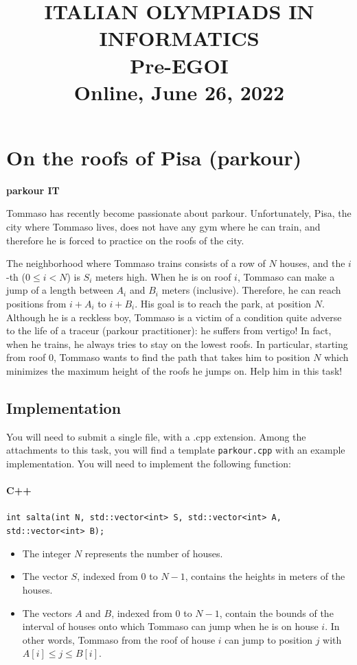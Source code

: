 \documentclass[11pt, a4paper]{article}
\title{\textbf{ITALIAN OLYMPIADS IN INFORMATICS}\\Pre-EGOI\\Online, June 26, 2022}
\author{}
\date{}
\begin{document}
\maketitle
\vspace{-4em}

\section*{On the roofs of Pisa (parkour)}
\textbf{parkour IT}

Tommaso has recently become passionate about parkour. Unfortunately, Pisa, the city where Tommaso lives, does not have any gym where he can train, and therefore he is forced to practice on the roofs of the city.

The neighborhood where Tommaso trains consists of a row of $N$ houses, and the $i$-th ($0\le i<N$) is $S_{i}$ meters high.
When he is on roof $i$, Tommaso can make a jump of a length between $A_{i}$ and $B_{i}$ meters (inclusive).
Therefore, he can reach positions from $i+A_{i}$ to $i+B_{i}$. His goal is to reach the park, at position $N$.
Although he is a reckless boy, Tommaso is a victim of a condition quite adverse to the life of a traceur (parkour practitioner): he suffers from vertigo!
In fact, when he trains, he always tries to stay on the lowest roofs.
In particular, starting from roof $0$, Tommaso wants to find the path that takes him to position $N$ which minimizes the maximum height of the roofs he jumps on.
Help him in this task!

\subsection*{Implementation}
You will need to submit a single file, with a .cpp extension.
Among the attachments to this task, you will find a template \texttt{parkour.cpp} with an example implementation.
You will need to implement the following function:

\paragraph{C++}
\texttt{int salta(int N, std::vector<int> S, std::vector<int> A, std::vector<int> B);}
\begin{itemize}
    \item The integer $N$ represents the number of houses.
    \item The vector $S$, indexed from $0$ to $N-1$, contains the heights in meters of the houses.
    \item The vectors $A$ and $B$, indexed from $0$ to $N-1$, contain the bounds of the interval of houses onto which Tommaso can jump when he is on house $i$. In other words, Tommaso from the roof of house $i$ can jump to position $j$ with $A[i]\le j\le B[i]$.
\end{itemize}
\end{document}
